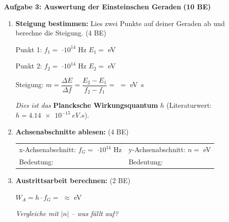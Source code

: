 \documentclass[11pt,a4paper]{article}
\begin{document}
\newpage


\textbf{Aufgabe 3: Auswertung der Einsteinschen Geraden} \hfill \textbf{(10 BE)}

\begin{enumerate}[label=\alph*)]
\item \textbf{Steigung bestimmen:} Lies zwei Punkte auf deiner Geraden ab und berechne die Steigung. \hfill (4 BE)

\vspace{0.3em}
Punkt 1: $f_1 = $ \underline{\hspace{1.5cm}} $\cdot 10^{14}$ Hz \quad $E_1 = $ \underline{\hspace{1.5cm}} eV

Punkt 2: $f_2 = $ \underline{\hspace{1.5cm}} $\cdot 10^{14}$ Hz \quad $E_2 = $ \underline{\hspace{1.5cm}} eV

\vspace{0.5em}

Steigung: $m = \dfrac{\Delta E}{\Delta f} = \dfrac{E_2 - E_1}{f_2 - f_1} = $ \underline{\hspace{3cm}} $= $ \underline{\hspace{2cm}} \si{eV.s}

\vspace{0.3em}
\textit{Dies ist das} \textbf{Plancksche Wirkungsquantum} $h$ (Literaturwert: $h = \SI{4,14e-15}{eV.s}$).

\vspace{0.8em}

\item \textbf{Achsenabschnitte ablesen:} \hfill (4 BE)

\begin{tabular}{@{}p{7cm}p{8cm}@{}}
x-Achsenabschnitt: $f_G = $ \underline{\hspace{2cm}} $\cdot 10^{14}$ Hz &
y-Achsenabschnitt: $n = $ \underline{\hspace{2cm}} eV \\[0.8em]
Bedeutung: \underline{\hspace{5cm}} &
Bedeutung: \underline{\hspace{5cm}} \\
\end{tabular}

\vspace{0.8em}

\item \textbf{Austrittsarbeit berechnen:} \hfill (2 BE)

$W_A = h \cdot f_G = $ \underline{\hspace{4cm}} $\approx$ \underline{\hspace{2cm}} eV

\vspace{0.3em}
\textit{Vergleiche mit $|n|$ -- was fällt auf?}

\end{enumerate}
\end{document}
